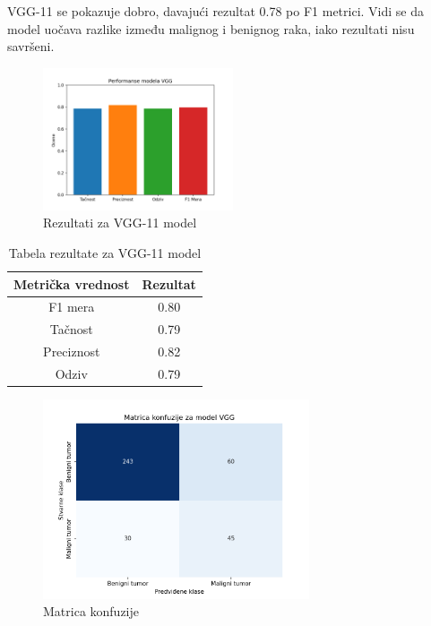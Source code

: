 \documentclass{article}
\begin{document}
VGG-11 se pokazuje dobro, davajući rezultat 0.78 po F1 metrici. Vidi se da model uočava razlike između malignog i benignog raka, iako rezultati nisu savršeni.

\begin{figure}[H]
    \centering
    \includegraphics[width=0.5\textwidth]{rezultati/VGG_rezultati.png} 
    \caption{Rezultati za VGG-11 model} 
    \label{VGG rezultati}
\end{figure}

\begin{table}[H]
    \centering
    \begin{tabular}{|c|c|}
        \hline
        \textbf{Metrička vrednost} & \textbf{Rezultat} \\ \hline
        F1 mera & 0.80 \\ \hline
        Tačnost & 0.79 \\ \hline
        Preciznost & 0.82 \\ \hline
        Odziv & 0.79 \\ \hline
    \end{tabular}
    \caption{Tabela rezultate za VGG-11 model}
    \label{tab:vgg11_performance}
\end{table}

\begin{figure}[H]
    \centering
    \includegraphics[width=0.7\textwidth]{rezultati/VGG_matrica_konfuzije.png} 
    \caption{Matrica konfuzije} 
    \label{VGG matrica konfuzije}
\end{figure}
\end{document}
